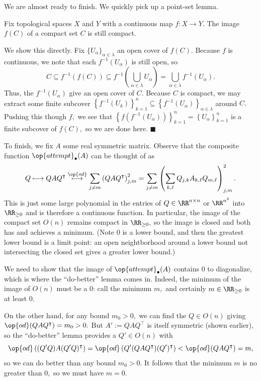 We are almost ready to finish. We quickly pick up a point-set lemma.
\begin{lemma}
    Fix topological spaces $X$ and $Y$ with a continuous map $f:X\to Y.$ The image $f(C)$ of a compact set $C$ is still compact.
\end{lemma}
We show this directly. Fix $\{U_\alpha\}_{\alpha\in\lambda}$ an open cover of $f(C).$ Because $f$ is continuous, we note that each $f^{-1}(U_\alpha)$ is still open, so
\[C\subseteq f^{-1}(f(C))\subseteq f^{-1}\left(\bigcup_{\alpha\in\lambda}U_\alpha\right)=\bigcup_{\alpha\in\lambda}f^{-1}(U_\alpha).\]
Thus, the $f^{-1}(U_\alpha)$ give an open cover of $C.$ Because $C$ is compact, we may extract some finite subcover $\left\{f^{-1}(U_k)\right\}_{k=1}^n\subseteq\left\{f^{-1}(U_\alpha)\right\}_{\alpha\in\lambda}$ around $C.$ Pushing this though $f,$ we see that $\left\{f\left(f^{-1}(U_\alpha)\right)\right\}_{k=1}^n=\left\{U_\alpha\right\}_{k=1}^n$ is a finite subcover of $f(C),$ so we are done here. $\blacksquare$

To finish, we fix $A$ some real symmetric matrix. Observe that the composite function $\op{attempt}_\bullet(A)$ can be thought of as
\[Q\longmapsto QAQ^\intercal\stackrel{\op{od}}\longmapsto\sum_{j\ne m}\left(QAQ^\intercal\right)_{j,m}^2=\sum_{j\ne m}\left(\sum_{k,\ell}Q_{j,k}A_{k,\ell}Q_{m,\ell}\right)^2_{j,m}.\]
This is just some large polynomial in the entries of $Q\in\RR^{n\times n}$ or $\RR^{n^2}$ into $\RR_{\ge0}$ and is therefore a continuous function. In particular, the image of the compact set $O(n)$ remains compact in $\RR_{\ge0},$ so the image is closed and both has and achieves a minimum. (Note $0$ is a lower bound, and then the greatest lower bound is a limit point: an open neightborhood around a lower bound not intersecting the closed set gives a greater lower bound.)

We need to show that the image of $\op{attempt}_\bullet(A)$ contains $0$ to diagonalize, which is where the ``do-better'' lemma comes in. Indeed, the minimum of the image of $O(n)$ must be a $0$: call the minimum $m,$ and certainly $m\in\RR_{\ge0}$ is at least $0.$

On the other hand, for any bound $m_0>0,$ we can find the $Q\in O(n)$ giving $\op{od}(QAQ^\intercal)=m_0>0.$ But $A':=QAQ^\intercal$ is itself symmetric (shown earlier), so the ``do-better'' lemma provides a $Q'\in O(n)$ with
\[\op{od}\left((Q'Q)A(Q'Q)^\intercal\right)=\op{od}\left(Q'(QAQ^\intercal)(Q')^\intercal\right)<\op{od}(QAQ^\intercal)=m,\]
so we can do better than any bound $m_0>0.$ It follows that the minimum $m$ is no greater than $0,$ so we must have $m=0.$

